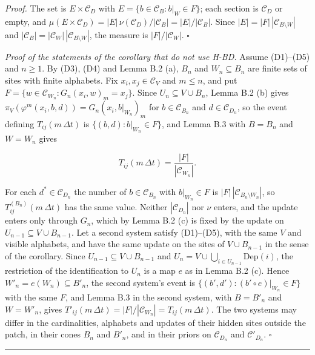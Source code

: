 \documentclass[
]{article}
\begin{document}
\emph{Proof.} The set is \(E \times \mathcal{C}_D\) with
\(E = \{b \in \mathcal{C}_B : b|_W \in F\}\); each section is
\(\mathcal{C}_D\) or empty, and
\(\mu(E \times \mathcal{C}_D) = |E|\,\nu(\mathcal{C}_D)/|\mathcal{C}_B| = |E|/|\mathcal{C}_B|\).
Since \(|E| = |F|\,|\mathcal{C}_{B \setminus W}|\) and
\(|\mathcal{C}_B| = |\mathcal{C}_W|\,|\mathcal{C}_{B \setminus W}|\),
the measure is \(|F|/|\mathcal{C}_W|\). \(\square\)

\emph{Proof of the statements of the corollary that do not use H-BD.}
Assume (D1)--(D5) and \(n \geq 1\). By (D3), (D4) and Lemma B.2 (a),
\(B_n\) and \(W_n \subseteq B_n\) are finite sets of sites with finite
alphabets. Fix \(x_i, x_j \in \mathcal{C}_V\) and \(m \leq n\), and put
\(F = \{w \in \mathcal{C}_{W_n} : G_n(x_i, w)_m = x_j\}\). Since
\(U_n \subseteq V \cup B_n\), Lemma B.2 (b) gives
\(\pi_V(\varphi^m(x_i, b, d)) = G_n(x_i, b|_{W_n})_m\) for
\(b \in \mathcal{C}_{B_n}\) and \(d \in \mathcal{C}_{D_n}\), so the
event defining \(T_{ij}(m\,\Delta t)\) is
\(\{(b, d) : b|_{W_n} \in F\}\), and Lemma B.3 with \(B = B_n\) and
\(W = W_n\) gives

\[T_{ij}(m\,\Delta t) = \frac{|F|}{|\mathcal{C}_{W_n}|}.\]

For each \(d^* \in \mathcal{C}_{D_n}\) the number of
\(b \in \mathcal{C}_{B_n}\) with \(b|_{W_n} \in F\) is
\(|F|\,|\mathcal{C}_{B_n \setminus W_n}|\), so
\(T^{(B_n)}_{ij}(m\,\Delta t)\) has the same value. Neither
\(|\mathcal{C}_{D_n}|\) nor \(\nu\) enters, and the update enters only
through \(G_n\), which by Lemma B.2 (c) is fixed by the update on
\(U_{n-1} \subseteq V \cup B_{n-1}\). Let a second system satisfy
(D1)--(D5), with the same \(V\) and visible alphabets, and have the same
update on the sites of \(V \cup B_{n-1}\) in the sense of the corollary.
Since \(U_{n-1} \subseteq V \cup B_{n-1}\) and
\(U_n = V \cup \bigcup_{i \in U_{n-1}} \mathrm{Dep}(i)\), the
restriction of the identification to \(U_n\) is a map \(e\) as in Lemma
B.2 (c). Hence \(W'_n = e(W_n) \subseteq B'_n\), the second system's
event is \(\{(b', d') : (b' \circ e)|_{W_n} \in F\}\) with the same
\(F\), and Lemma B.3 in the second system, with \(B = B'_n\) and
\(W = W'_n\), gives
\(T'_{ij}(m\,\Delta t) = |F|/|\mathcal{C}_{W_n}| = T_{ij}(m\,\Delta t)\).
The two systems may differ in the cardinalities, alphabets and updates
of their hidden sites outside the patch, in their cones \(B_n\) and
\(B'_n\), and in their priors on \(\mathcal{C}_{D_n}\) and
\(\mathcal{C}'_{D_n}\). \(\square\)

\begin{center}\rule{0.5\linewidth}{0.5pt}\end{center}
\end{document}
